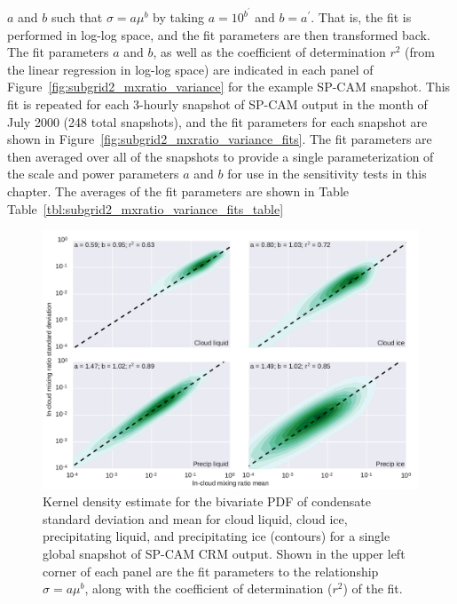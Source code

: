 \(a\) and \(b\) such that \(\sigma = a \mu^b\) by taking
\(a = 10^{b^{\prime}}\) and \(b = a^{\prime}\). That is, the fit is
performed in log-log space, and the fit parameters are then transformed
back. The fit parameters \(a\) and \(b\), as well as the coefficient of
determination \(r^2\) (from the linear regression in log-log space) are
indicated in each panel of Figure~\ref{fig:subgrid2_mxratio_variance}
for the example SP-CAM snapshot. This fit is repeated for each 3-hourly
snapshot of SP-CAM output in the month of July 2000 (248 total
snapshots), and the fit parameters for each snapshot are shown in
Figure~\ref{fig:subgrid2_mxratio_variance_fits}. The fit parameters are
then averaged over all of the snapshots to provide a single
parameterization of the scale and power parameters \(a\) and \(b\) for
use in the sensitivity tests in this chapter. The averages of the fit
parameters are shown in Table
Table~\ref{tbl:subgrid2_mxratio_variance_fits_table}

\begin{figure}[htbp]
\centering
\includegraphics{graphics/subgrid2_mxratio_variance.pdf}
\caption{\label{fig:subgrid2_mxratio_variance}Kernel density estimate
for the bivariate PDF of condensate standard deviation and mean for
cloud liquid, cloud ice, precipitating liquid, and precipitating ice
(contours) for a single global snapshot of SP-CAM CRM output. Shown in
the upper left corner of each panel are the fit parameters to the
relationship \(\sigma = a \mu^b\), along with the coefficient of
determination (\(r^2\)) of the
fit.}\label{fig:subgrid2ux5fmxratioux5fvariance}
\end{figure}

